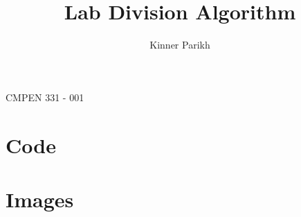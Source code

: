\documentclass[11pt]{article}
\begin{document}
%
\author{Kinner Parikh} 
\title{Lab Division Algorithm}
\maketitle
\begin{center}
    CMPEN 331 - 001
\end{center}

\newpage

\section{Code}


\ttfamily


\newpage

\ttfamily


\newpage

\ttfamily


\newpage

\rmfamily
\section{Images}
\end{document}
